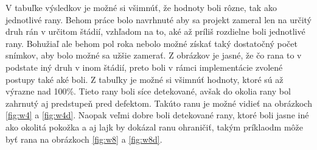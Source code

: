 V tabuľke výsledkov je možné si všimnúť, že hodnoty boli rôzne, tak ako jednotlivé rany. Behom práce bolo navrhnuté aby sa projekt zameral len na určitý druh rán v určitom štádií, vzhľadom na to, aké až príliš rozdielne boli jednotlivé rany. Bohužiaľ ale behom pol roka nebolo možné získať taký dostatočný počet snímkov, aby bolo možné sa užšie zamerať. Z obrázkov je jasné, že čo rana to v podstate iný druh v inom štádií, preto boli v rámci implementácie zvolené postupy také aké boli. Z tabuľky je možné si všimnúť hodnoty, ktoré sú až výrazne nad 100\%. Tieto rany boli síce detekované, avšak do okolia rany bol zahrnutý aj predstupeň pred defektom. Takúto ranu je možné vidieť na obrázkoch \ref{fig:w4} a \ref{fig:w4d}. Naopak veľmi dobre boli detekované rany, ktoré boli jasne iné ako okolitá pokožka a aj lajk by dokázal ranu ohraničiť, takým príklaodm môže byť rana na obrázkoch \ref{fig:w8} a \ref{fig:w8d}.

